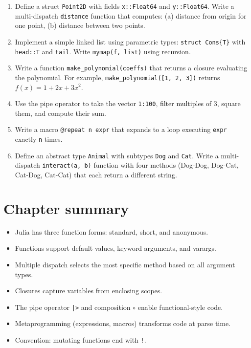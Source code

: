 \begin{exercise}
\begin{enumerate}
  \item Define a struct \texttt{Point2D} with fields \texttt{x::Float64} and \texttt{y::Float64}. Write a multi-dispatch \texttt{distance} function that computes: (a) distance from origin for one point, (b) distance between two points.
  \item Implement a simple linked list using parametric types: \texttt{struct Cons\{T\}} with \texttt{head::T} and \texttt{tail}. Write \texttt{mymap(f, list)} using recursion.
  \item Write a function \texttt{make\_polynomial(coeffs)} that returns a closure evaluating the polynomial. For example, \texttt{make\_polynomial([1, 2, 3])} returns $f(x) = 1 + 2x + 3x^2$.
  \item Use the pipe operator to take the vector \texttt{1:100}, filter multiples of 3, square them, and compute their sum.
  \item Write a macro \texttt{@repeat n expr} that expands to a loop executing \texttt{expr} exactly \texttt{n} times.
  \item Define an abstract type \texttt{Animal} with subtypes \texttt{Dog} and \texttt{Cat}. Write a multi-dispatch \texttt{interact(a, b)} function with four methods (Dog-Dog, Dog-Cat, Cat-Dog, Cat-Cat) that each return a different string.
\end{enumerate}
\end{exercise}

\section{Chapter summary}

\begin{itemize}
  \item Julia has three function forms: standard, short, and anonymous.
  \item Functions support default values, keyword arguments, and varargs.
  \item Multiple dispatch selects the most specific method based on all argument types.
  \item Closures capture variables from enclosing scopes.
  \item The pipe operator \texttt{|>} and composition \texttt{$\circ$} enable functional-style code.
  \item Metaprogramming (expressions, macros) transforms code at parse time.
  \item Convention: mutating functions end with \texttt{!}.
\end{itemize}
